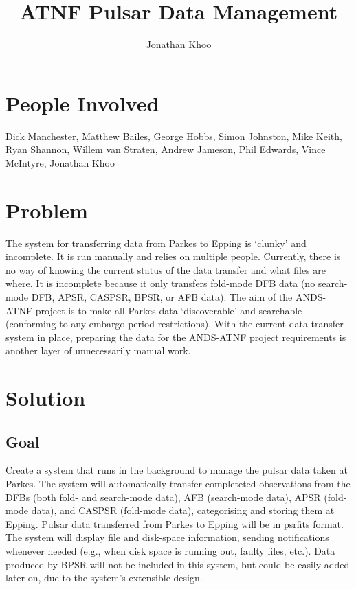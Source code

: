 \documentclass{article}
\begin{document}
\title{ATNF Pulsar Data Management}
\author{Jonathan Khoo}
\date{}
\maketitle

\section{People Involved}
Dick Manchester, Matthew Bailes, George Hobbs, Simon Johnston, Mike Keith, Ryan Shannon, Willem van Straten, Andrew Jameson, Phil Edwards, Vince McIntyre, Jonathan Khoo

\section{Problem}
The system for transferring data from Parkes to Epping is `clunky' and incomplete. It is run manually and relies on multiple people. Currently, there is no way of knowing the current status of the data transfer and what files are where. It is incomplete because it only transfers fold-mode DFB data (no search-mode DFB, APSR, CASPSR, BPSR, or AFB data). The aim of the ANDS-ATNF project is to make all Parkes data `discoverable' and searchable (conforming to any embargo-period restrictions). With the current data-transfer system in place, preparing the data for the ANDS-ATNF project requirements is another layer of unnecessarily manual work.

\section{Solution}
\subsection{Goal}
Create a system that runs in the background to manage the pulsar data taken at Parkes. The system will automatically transfer completeted observations from the DFBs (both fold- and search-mode data), AFB (search-mode data), APSR (fold-mode data), and CASPSR (fold-mode data), categorising and storing them at Epping. Pulsar data transferred from Parkes to Epping will be in psrfits format. The system will display file and disk-space information, sending notifications whenever needed (e.g., when disk space is running out, faulty files, etc.). Data produced by BPSR will not be included in this system, but could be easily added later on, due to the system's extensible design.
\end{document}
